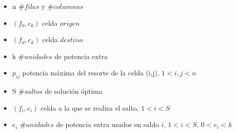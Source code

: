 \documentclass[11pt, a4paper, twoside]{article}
\begin{document}
	\begin{itemize}
		\item n $\#filas$ y $\#columnas$
		\item $(f_{0},c_{0})$ celda $origen$
		\item $(f_{d},c_{d})$ celda $destino$
		\item k $\#unidades$ de potencia extra
		\item $p_{ij}$ potencia máxima del resorte de la celda (i,j), $1 < i,j < n$
		\item S $\#saltos$ de solución óptima
		\item $(f_{i},c_{i})$ celda a la que se realiza el salto, $1 < i < S$
		\item ${e_i}$ $\#unidades$ de potencia extra usados en saldo $i$, $1 < i <S$, $0 < e_i < k$	\\
	\end{itemize} 
 
\end{document}
